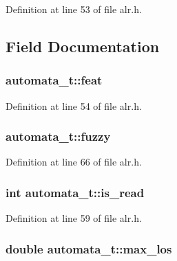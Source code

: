 Definition at line 53 of file alr.\-h.



\subsection{Field Documentation}
\hypertarget{structautomata__t_aea937bcdfee70c1a1c33ebdd8abe22e4}{
\subsubsection[{feat}]{ automata\-\_\-t\-::feat}}\label{structautomata__t_aea937bcdfee70c1a1c33ebdd8abe22e4}


Definition at line 54 of file alr.\-h.

\hypertarget{structautomata__t_aeb015ceca00323d9a3ef30c7cb219246}{
\subsubsection[{fuzzy}]{ automata\-\_\-t\-::fuzzy}}\label{structautomata__t_aeb015ceca00323d9a3ef30c7cb219246}


Definition at line 66 of file alr.\-h.

\hypertarget{structautomata__t_a2d180cfe5698f6f9999b03cebaf83fcd}{
\subsubsection[{is\-\_\-read}]{\setlength{\rightskip}{0pt plus 5cm}int automata\-\_\-t\-::is\-\_\-read}}\label{structautomata__t_a2d180cfe5698f6f9999b03cebaf83fcd}


Definition at line 59 of file alr.\-h.

\hypertarget{structautomata__t_ac1b32f1fedaa18ce4660e0c861d02499}{
\subsubsection[{max\-\_\-los}]{\setlength{\rightskip}{0pt plus 5cm}double automata\-\_\-t\-::max\-\_\-los}}\label{structautomata__t_ac1b32f1fedaa18ce4660e0c861d02499}


